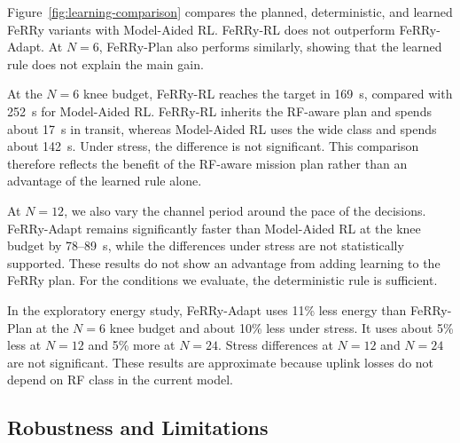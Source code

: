 \documentclass[conference]{IEEEtran}
\newcommand{\sysname}{FeRRy}
\begin{document}
Figure~\ref{fig:learning-comparison} compares the planned, deterministic, and
learned \sysname{} variants with Model-Aided RL. \sysname{}-RL does not
outperform \sysname{}-Adapt. At \(N=6\), \sysname{}-Plan also performs
similarly, showing that the learned rule does not explain the main gain.

At the \(N=6\) knee budget, \sysname{}-RL reaches the target in 169~s,
compared with 252~s for Model-Aided RL. \sysname{}-RL inherits the RF-aware
plan and spends about 17~s in transit, whereas Model-Aided RL uses the wide
class and spends about 142~s. Under stress, the difference is not significant.
This comparison therefore reflects the benefit of the RF-aware mission plan
rather than an advantage of the learned rule alone.

At \(N=12\), we also vary the channel period around the pace of the decisions.
\sysname{}-Adapt remains significantly faster than Model-Aided RL at the knee
budget by 78--89~s, while the differences under stress are not statistically
supported. These results do not show an advantage from adding learning to the
\sysname{} plan. For the conditions we evaluate, the deterministic rule is
sufficient.

In the exploratory energy study, \sysname{}-Adapt uses 11\% less energy than
\sysname{}-Plan at the \(N=6\) knee budget and about 10\% less under stress.
It uses about 5\% less at \(N=12\) and 5\% more at \(N=24\). Stress differences
at \(N=12\) and \(N=24\) are not significant. These results are approximate
because uplink losses do not depend on RF class in the current model.


\subsection{Robustness and Limitations}
\label{app:robustness}
\end{document}
